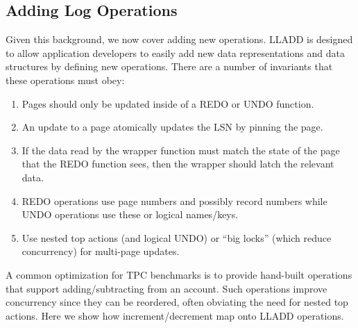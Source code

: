\documentclass[10pt,letterpaper,twocolumn,english]{article}
\newcommand{\yad}{LLADD\xspace}
\begin{document}
\subsection{Adding Log Operations}
\label{op-def}


Given this background, we now cover adding new operations. \yad is
designed to allow application developers to easily add new data
representations and data structures by defining new operations.
There are a number of invariants that these operations must obey:
\begin{enumerate}
\item Pages should only be updated inside of a REDO or UNDO function.
\item An update to a page atomically updates the LSN by pinning the page.
\item If the data read by the wrapper function must match the state of
the page that the REDO function sees, then the wrapper should latch
the relevant data.
\item REDO operations use page numbers and possibly record numbers
while UNDO operations use these or logical names/keys.
\item Use nested top actions (and logical UNDO) 
or ``big locks'' (which reduce concurrency) for multi-page updates.
\end{enumerate}


A common optimization for TPC benchmarks is to provide hand-built
operations that support adding/subtracting from an account.  Such
operations improve concurrency since they can be reordered, often
obviating the need for nested top actions. 
Here we show how increment/decrement map onto \yad operations.
\end{document}
